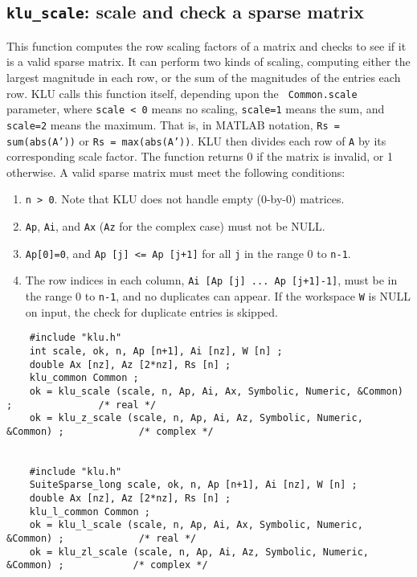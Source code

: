 \documentclass[11pt]{article}
\begin{document}
\subsection{{\tt klu\_scale}: scale and check a sparse matrix}

This function computes the row scaling factors of a matrix and checks to see if
it is a valid sparse matrix.  It can perform two kinds of scaling, computing
either the largest magnitude in each row, or the sum of the magnitudes of the
entries each row.  KLU calls this function itself, depending upon the {\tt
Common.scale} parameter, where {\tt scale < 0} means no scaling, {\tt scale=1}
means the sum, and {\tt scale=2} means the maximum.  That is, in MATLAB
notation, {\tt Rs = sum(abs(A'))} or {\tt Rs = max(abs(A'))}.  KLU then divides
each row of {\tt A} by its corresponding scale factor.  The function returns 0
if the matrix is invalid, or 1 otherwise.  A valid sparse matrix must meet the
following conditions:

\begin{enumerate}
\item {\tt n > 0}.  Note that KLU does not handle empty (0-by-0) matrices.
\item {\tt Ap}, {\tt Ai}, and {\tt Ax} ({\tt Az} for the complex case) must not be NULL.
\item {\tt Ap[0]=0}, and {\tt Ap [j] <= Ap [j+1]} for all {\tt j} in the range 0 to {\tt n-1}.
\item The row indices in each column, {\tt Ai [Ap [j] ... Ap [j+1]-1]}, must be in
the range 0 to {\tt n-1}, and no duplicates can appear.  If the workspace {\tt W} is
NULL on input, the check for duplicate entries is skipped.
\end{enumerate}

{\footnotesize
\begin{verbatim}
    #include "klu.h"
    int scale, ok, n, Ap [n+1], Ai [nz], W [n] ;
    double Ax [nz], Az [2*nz], Rs [n] ;
    klu_common Common ;
    ok = klu_scale (scale, n, Ap, Ai, Ax, Symbolic, Numeric, &Common) ;               /* real */
    ok = klu_z_scale (scale, n, Ap, Ai, Az, Symbolic, Numeric, &Common) ;             /* complex */


    #include "klu.h"
    SuiteSparse_long scale, ok, n, Ap [n+1], Ai [nz], W [n] ;
    double Ax [nz], Az [2*nz], Rs [n] ;
    klu_l_common Common ;
    ok = klu_l_scale (scale, n, Ap, Ai, Ax, Symbolic, Numeric, &Common) ;             /* real */
    ok = klu_zl_scale (scale, n, Ap, Ai, Az, Symbolic, Numeric, &Common) ;            /* complex */
\end{verbatim}
}
\end{document}
